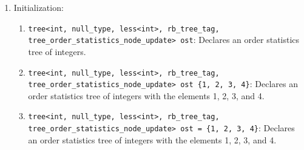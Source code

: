 \begin{enumerate}
\begin{enumerate}
\begin{enumerate}
\begin{lstlisting}[language=C++]
	    \end{lstlisting}
	  \item Initialization:
	    \begin{enumerate}
	      \item \texttt{tree<int, null\_type, less<int>, rb\_tree\_tag, tree\_order\_statistics\_node\_update> ost}: Declares an order statistics tree of integers.
	      \item \texttt{tree<int, null\_type, less<int>, rb\_tree\_tag, tree\_order\_statistics\_node\_update> ost \{1, 2, 3, 4\}}: Declares an order statistics tree of integers with the elements 1, 2, 3, and 4.
	      \item \texttt{tree<int, null\_type, less<int>, rb\_tree\_tag, tree\_order\_statistics\_node\_update> ost = \{1, 2, 3, 4\}}: Declares an order statistics tree of integers with the elements 1, 2, 3, and 4.
	    \end{enumerate}
	\end{enumerate}
    \end{enumerate}
  \end{enumerate}
